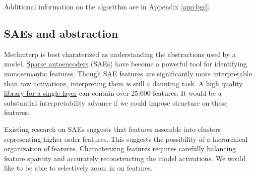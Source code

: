 Additional information on the algorithm are in Appendix \ref{app:bgd}.

%

\subsection{SAEs and abstraction}
Mechinterp is best charaterized as understanding the abstractions used by a model.
\hyperlink{}{Sparse autoencoders} (SAEs) have become a powerful tool for identifying monosemantic features.
Though SAE features are significantly more interpretable than raw activations, interpreting them is still a daunting task.
\hyperlink{https://www.lesswrong.com/posts/f9EgfLSurAiqRJySD/open-source-sparse-autoencoders-for-all-residual-stream}{A high quality library for a single layer}
can contain over 25,000 features.
It would be a substantial interpretability advance if we could impose structure on these features.

Existing research on SAEs suggests that features assemble into clusters representing higher order features.
This suggests the possibility of a hierarchical organization of features.
Characterizing features requires carefully balancing feature sparcity and accurately reconstructing the model activations.
We would like to be able to selectively zoom in on features.


